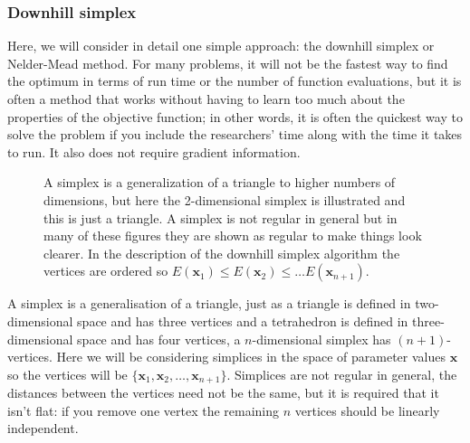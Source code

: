 \documentclass[12pt]{article}
\begin{document}
\subsubsection*{Downhill simplex}
Here, we
will consider in detail one simple approach: the downhill simplex or
Nelder-Mead method. For many problems, it will not be the fastest way
to find the optimum in terms of run time or the number of function
evaluations, but it is often a method that works without having to
learn too much about the properties of the objective function; in
other words, it is often the quickest way to solve the problem if you
include the researchers' time along with the time it takes to run. It
also does not require gradient information.

\begin{figure}
\begin{center}
\end{center}
\caption{A simplex is a generalization of a triangle to higher numbers
  of dimensions, but here the 2-dimensional simplex is illustrated and
  this is just a triangle. A simplex is not regular in general but in
  many of these figures they are shown as regular to make things look
  clearer. In the description of the downhill simplex algorithm the
  vertices are ordered so $E(\mathbf{x}_1)\le E(\mathbf{x}_2)\le \ldots
  E(\mathbf{x}_{n+1})$.\label{fig:simplex}}
\end{figure}

A simplex is a generalisation of a triangle, just as a triangle is
defined in two-dimensional space and has three vertices and a
tetrahedron is defined in three-dimensional space and has four
vertices, a $n$-dimensional simplex has $(n+1)$-vertices. Here we will
be considering simplices in the space of parameter values $\mathbf{x}$
so the vertices will be
$\{\mathbf{x}_1,\mathbf{x}_2,\ldots,\mathbf{x}_{n+1}\}$. Simplices are
not regular in general, the distances between the vertices need not be
the same, but it is required that it isn't flat: if you remove one
vertex the remaining $n$ vertices should be linearly independent.
\end{document}
